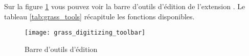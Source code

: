 {%
\label{label_grasstoolbar}

Sur la figure \ref{fig:grass_digitizing_toolbar} vous pouvez voir la barre d'outils d'édition \grass de l'extension \grass. Le tableau \ref{tab:grass_tools} récapitule les fonctions disponibles.

\begin{figure}[h]
   \begin{center}
   \texttt{[image: grass\_digitizing\_toolbar]}
   \caption{Barre d'outils d'édition \grass \nixcaption}\label{fig:grass_digitizing_toolbar} 
\end{center}  
\end{figure}
{\renewcommand{\arraystretch}{2}
\begin{table}[p]
\centering
 \begin{tabular}{|m{1cm}|m{4cm}|m{8.5cm}|}

\end{tabular}
\end{table}}}
